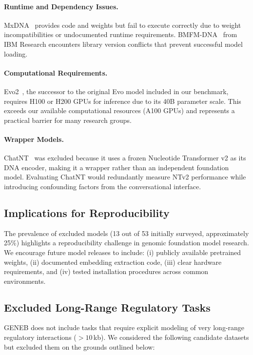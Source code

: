 \documentclass{llmxive}
\begin{document}
\paragraph{Runtime and Dependency Issues.}
MxDNA~\cite{mxdna} provides code and weights but fail to execute correctly due to weight incompatibilities or undocumented runtime requirements. BMFM-DNA~\cite{bmfmdna} from IBM Research encounters library version conflicts that prevent successful model loading.

\paragraph{Computational Requirements.}
Evo2~\cite{evo2}, the successor to the original Evo model included in our benchmark, requires H100 or H200 GPUs for inference due to its 40B parameter scale. This exceeds our available computational resources (A100 GPUs) and represents a practical barrier for many research groups.

\paragraph{Wrapper Models.}
ChatNT~\cite{chatnt} was excluded because it uses a frozen Nucleotide Transformer v2 as its DNA encoder, making it a wrapper rather than an independent foundation model. Evaluating ChatNT would redundantly measure NTv2 performance while introducing confounding factors from the conversational interface.

\subsection{Implications for Reproducibility}

The prevalence of excluded models (13 out of 53 initially surveyed, approximately 25\%) highlights a reproducibility challenge in genomic foundation model research. We encourage future model releases to include: (i) publicly available pretrained weights, (ii) documented embedding extraction code, (iii) clear hardware requirements, and (iv) tested installation procedures across common environments.

\subsection{Excluded Long-Range Regulatory Tasks}
\label{subsec:excluded_long_range_tasks}

GENEB does not include tasks that require explicit modeling of very
long-range regulatory interactions ($>10$\,kb). We considered the
following candidate datasets but excluded them on the grounds outlined
below:
\end{document}
